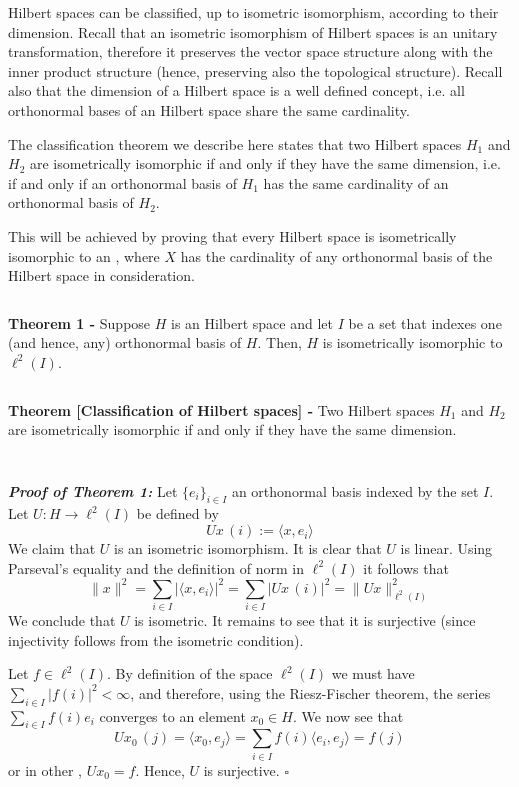 \documentclass[12pt]{article}
\begin{document}
Hilbert spaces can be classified, up to isometric isomorphism, according to their dimension. Recall that an isometric isomorphism of Hilbert spaces is an unitary transformation, therefore it preserves the vector space structure along with the inner product structure (hence, preserving also the topological structure). Recall also that the dimension of a Hilbert space is a well defined concept, i.e. all orthonormal bases of an Hilbert space share the same cardinality.

The classification theorem we describe here states that two Hilbert spaces $H_1$ and $H_2$ are isometrically isomorphic if and only if they have the same dimension, i.e. if and only if an orthonormal basis of $H_1$ has the same cardinality of an orthonormal basis of $H_2$.

This will be achieved by proving that every Hilbert space is isometrically isomorphic to an , where $X$ has the cardinality of any orthonormal basis of the Hilbert space in consideration.

$\,$

{\bf Theorem 1 -} Suppose $H$ is an Hilbert space and let $I$ be a set that indexes one (and hence, any) orthonormal basis of $H$. Then, $H$ is isometrically isomorphic to $\ell^2(I)$.

$\,$

{\bf Theorem [Classification of Hilbert spaces] -} Two Hilbert spaces $H_1$ and $H_2$ are isometrically isomorphic if and only if they have the same dimension.

$\,$

$\,$

{\bf \emph{Proof of Theorem 1:}} Let $\{e_i\}_{i \in I}$ an orthonormal basis indexed by the set $I$. Let $U: H \longrightarrow \ell^2(I)$ be defined by
\begin{displaymath}
Ux \,(i) := \langle x, e_i \rangle
\end{displaymath}
We claim that $U$ is an isometric isomorphism. It is clear that $U$ is linear. Using Parseval's equality and the definition of norm in $\ell^2(I)$ it follows that
\begin{displaymath}
\|x\|^2 = \sum_{i \in I} |\langle x, e_i \rangle|^2 = \sum_{i \in I} |Ux\,(i)|^2 = \|Ux\|^2_{\ell^2(I)}
\end{displaymath}
We conclude that $U$ is isometric. It remains to see that it is surjective (since injectivity follows from the isometric condition).

Let $f \in \ell^2(I)$. By definition of the space $\ell^2(I)$ we must have $\displaystyle \sum_{i \in I} |f(i)|^2 < \infty$, and therefore, using the Riesz-Fischer theorem, the series $\displaystyle \sum_{i\in I} f(i)e_i$ converges to an element $x_0 \in H$. We now see that
\begin{displaymath}
Ux_0 \,(j) = \langle x_0, e_j \rangle = \sum_{i \in I} f(i)\langle e_i, e_j\rangle = f(j)
\end{displaymath}
or in other , $Ux_0 = f$. Hence, $U$ is surjective. $\square$
\end{document}
